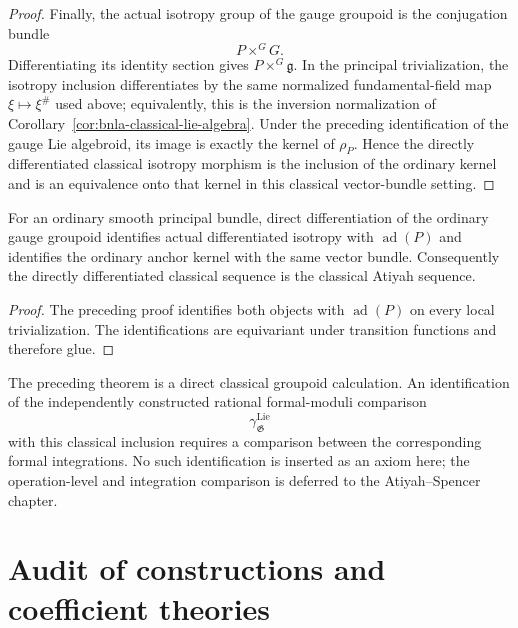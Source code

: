 \begin{proof}
Finally, the actual isotropy group of the gauge groupoid is the conjugation
bundle
\[
    P\times^G G.
\]
Differentiating its identity section gives
$P\times^G\mathfrak g$.  In the principal trivialization, the isotropy
inclusion differentiates by the same normalized fundamental-field map
$\xi\mapsto\xi^\#$ used above; equivalently, this is the inversion
normalization of
Corollary~\ref{cor:bnla-classical-lie-algebra}.  Under the preceding
identification of the gauge Lie algebroid, its image is exactly the kernel of
$\rho_P$.  Hence the directly differentiated classical isotropy morphism is
the inclusion of the ordinary kernel and is an equivalence onto that kernel
in this classical vector-bundle setting.
\end{proof}

\begin{corollary}
\label{cor:bnla-classical-gauge-atiyah-identification}
For an ordinary smooth principal bundle, direct differentiation of the
ordinary gauge groupoid identifies actual differentiated isotropy with
$\operatorname{ad}(P)$ and identifies the ordinary anchor kernel with the same
vector bundle.  Consequently the directly differentiated classical sequence
is the classical Atiyah sequence.
\end{corollary}

\begin{proof}
The preceding proof identifies both objects with
$\operatorname{ad}(P)$ on every local trivialization.  The identifications are
equivariant under transition functions and therefore glue.
\end{proof}

\begin{remark}
The preceding theorem is a direct classical groupoid calculation.  An
identification of the independently constructed rational formal-moduli
comparison
\[
    \gamma^{\mathrm{Lie}}_{\mathfrak G}
\]
with this classical inclusion requires a comparison between the corresponding
formal integrations.  No such identification is inserted as an axiom here;
the operation-level and integration comparison is deferred to the
Atiyah--Spencer chapter.
\end{remark}

\section{Audit of constructions and coefficient theories}
\label{sec:bnla-recognition-audit}

